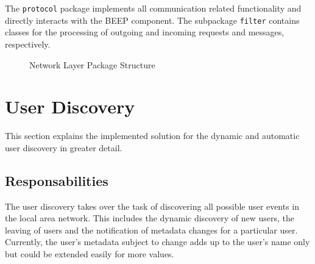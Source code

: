 The \texttt{protocol} package implements all communication related functionality and directly interacts with the BEEP component. The subpackage \texttt{filter} contains classes for the processing of outgoing and incoming requests and messages, respectively.

\begin{figure}[htb]
 \centering
 \caption{Network Layer Package Structure}
 \label{fig:network.architecture}
\end{figure}


\section{User Discovery}
This section explains the implemented solution for the dynamic and automatic user discovery in greater detail.

\subsection{Responsabilities}
The user discovery takes over the task of discovering all possible user events in the local area network. This includes the dynamic discovery of new users, the leaving of users and the notification of metadata changes for a particular user. Currently, the user's metadata subject to change adds up to the user's name only but could be extended easily for more values.

